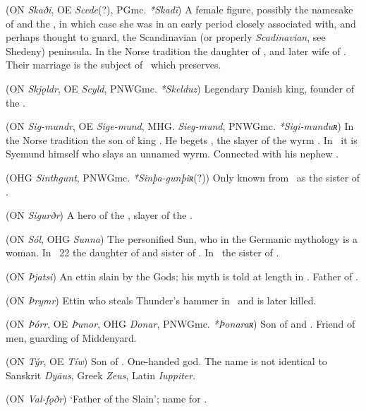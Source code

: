 \begin{itemize}
 (ON \emph{Skaði}, OE \emph{Scede}(?), PGmc. \emph{*Skadī})
  A female figure, possibly the namesake of  and the , in which case she was in an early period closely associated with, and perhaps thought to guard, the Scandinavian (or properly \emph{Scadinavian}, see Shedeny) peninsula.
  In the Norse tradition the daughter of , and later wife of .  Their marriage is the subject of \Gylfaginning\ which preserves.

 (ON \emph{Skjǫldr}, OE \emph{Scyld}, PNWGmc. \emph{*Skelduz})
  Legendary Danish king, founder of the .

 (ON \emph{Sig-mundr}, OE \emph{Sige-mund}, MHG. \emph{Sieg-mund}, PNWGmc. \emph{*Sigi-munduʀ})
  In the Norse tradition the son of king .  He begets , the slayer of the wyrm .  In \Beowulf\ it is Syemund himself who slays an unnamed wyrm.  Connected with his nephew .

 (OHG \emph{Sinthgunt}, PNWGmc. \emph{*Sinþa-gunþiʀ}(?))
  Only known from \MerseburgTwo\ as the sister of .

 (ON \emph{Sigurðr})
  A hero of the , slayer of the  .

 (ON \emph{Sól}, OHG \emph{Sunna})
  The personified Sun, who in the Germanic mythology is a woman.  In \Vafthrudnismal\ 22 the daughter of  and sister of .  In \MerseburgTwo\ the sister of .

 (ON \emph{Þjatsi})
  An ettin slain by the Gods; his myth is told at length in \Haustlong.  Father of .

 (ON \emph{Þrymr})
  Ettin who steals Thunder’s hammer in \Thrymskvida\ and is later killed.

 (ON \emph{Þórr}, OE \emph{Þunor}, OHG \emph{Donar}, PNWGmc. \emph{*Þonaraʀ})
  Son of  and .  Friend of men, guarding of Middenyard.

 (ON \emph{Týr}, OE \emph{Tíw})
  Son of .  One-handed god.  The name is not identical to Sanskrit \emph{Dyāus}, Greek \emph{Zeus}, Latin \emph{Iuppiter}.

 (ON \emph{Val-fǫðr})
  ‘Father of the Slain’; name for .


\end{itemize}
